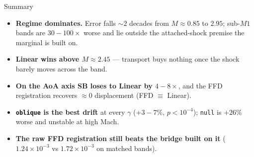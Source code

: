 \documentclass[aspectratio=169]{beamer}
\begin{document}
\begin{frame}{Summary}
\begin{itemize}
  \item \textbf{Regime dominates.} Error falls $\sim\!2$ decades from
        $M\!\approx\!0.85$ to $2.95$; sub-$M1$ bands are $30\!-\!100\times$ worse
        and lie outside the attached-shock premise the marginal is built on.
  \item \textbf{Linear wins above $M\approx2.45$} --- transport buys nothing once
        the shock barely moves across the band.
  \item \textbf{On the AoA axis SB loses to Linear by $4\!-\!8\times$}, and the
        FFD registration recovers $\approx\!0$ displacement (FFD $\equiv$ Linear).
  \item \textbf{\texttt{oblique} is the best drift} at every $\gamma$
        ($+3\!-\!7\%$, $p<10^{-4}$); \texttt{null} is $+26\%$ worse and unstable
        at high Mach.
  \item \textbf{The raw FFD registration still beats the bridge built on it}
        ($1.24\!\times\!10^{-3}$ vs $1.72\!\times\!10^{-3}$ on matched bands).
\end{itemize}\end{frame}
\end{document}
